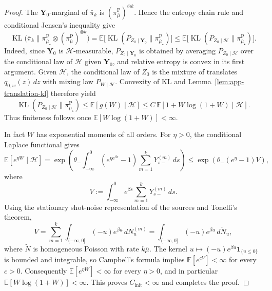 \documentclass[10pt,a4paper]{amsart}
\newcommand{\E}{\mathbb{E}}
\newcommand{\KL}{\operatorname{KL}}
\newcommand{\thetalo}{\theta_-}
\begin{document}
\begin{proof}
The $\mathbf Y_0$-marginal of $\bar\pi_k$ is
$(\pi_{\bar\mu}^{\mathrm P})^{\otimes k}$. Hence the entropy chain rule and
conditional Jensen's inequality give
\[
\KL\!\bigl(\bar\pi_k\|\pi_{\bar\mu_\star}^{\mathrm P}\otimes
(\pi_{\bar\mu}^{\mathrm P})^{\otimes k}\bigr)
= \E\bigl[\KL(P_{Z_0\mid \mathbf Y_0}\|\pi_{\bar\mu_\star}^{\mathrm P})\bigr]
\le \E\bigl[\KL(P_{Z_0\mid \mathcal H}\|\pi_{\bar\mu_\star}^{\mathrm P})\bigr].
\]
Indeed, since \(\mathbf Y_0\) is \(\mathcal H\)-measurable,
\(P_{Z_0\mid \mathbf Y_0}\) is obtained by averaging
\(P_{Z_0\mid \mathcal H}\) over the conditional law of \(\mathcal H\) given
\(\mathbf Y_0\), and relative entropy is convex in its first argument.
Given $\mathcal H$, the conditional law of $Z_0$ is the mixture of translates
$q_{0,w}(z)\,dz$ with mixing law $P_{W\mid\mathcal H}$. Convexity of KL and
Lemma~\ref{lem:app-translation-kl} therefore yield
\[
\KL(P_{Z_0\mid \mathcal H}\|\pi_{\bar\mu_\star}^{\mathrm P})
\le \E[g(W)\mid\mathcal H]
\le C\, \E[1+W\log(1+W)\mid\mathcal H].
\]
Thus finiteness follows once $\E[W\log(1+W)]<\infty$.

In fact $W$ has exponential moments of all orders. For $\eta>0$, the conditional
Laplace functional gives
\[
\E[e^{\eta W}\mid\mathcal H]
=
\exp\!\left(\thetalo\int_{-\infty}^0
(e^{\eta e^{\beta s}}-1)\sum_{m=1}^kY_{s-}^{(m)}\,ds\right)
\le
\exp\!\left(\thetalo(e^\eta-1)V\right),
\]
where
\[
V:=\int_{-\infty}^0 e^{\beta s}\sum_{m=1}^kY_{s-}^{(m)}\,ds.
\]
Using the stationary shot-noise representation of the sources and Tonelli's
theorem,
\[
V=\sum_{m=1}^k\int_{(-\infty,0]}(-u)e^{\beta u}\,dN_u^{(m)}
=\int_{(-\infty,0]}(-u)e^{\beta u}\,d\widetilde N_u,
\]
where $\widetilde N$ is homogeneous Poisson with rate $k\bar\mu$. The kernel
$u\mapsto(-u)e^{\beta u}\mathbf 1_{\{u\le0\}}$ is bounded and integrable, so
Campbell's formula implies $\E[e^{cV}]<\infty$ for every $c>0$. Consequently
$\E[e^{\eta W}]<\infty$ for every $\eta>0$, and in particular
$\E[W\log(1+W)]<\infty$. This proves $C_{\mathrm{init}}<\infty$ and completes
the proof.
\end{proof}
\end{document}
